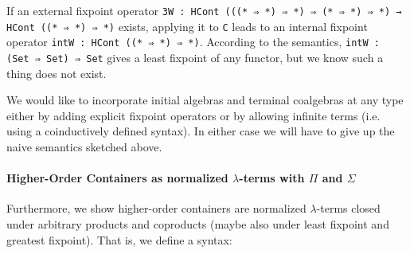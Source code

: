 \documentclass{easychair}
\begin{document}
\noindent
If an external fixpoint operator \texttt{3W : HCont (((* ⇒ *) ⇒ *) ⇒ (* ⇒ *) ⇒ *) → HCont ((* ⇒ *) ⇒ *)}
exists, applying it to \texttt{C} leads to an internal fixpoint operator \texttt{intW : HCont ((* ⇒ *) ⇒ *)}.
According to the semantics, \texttt{intW : (Set ⇒ Set) ⇒ Set} gives a least fixpoint of any functor, but we know such a thing does not
exist.

We would like to incorporate initial algebras and terminal coalgebras
at any type either by adding explicit fixpoint operators or by
allowing infinite terms (i.e. using a coinductively defined syntax).
In either case we will have to give up the naive semantics sketched
above. 

\paragraph{Higher-Order Containers as normalized $\lambda$-terms with $\Pi$ and $\Sigma$} 
Furthermore, we show higher-order containers are normalized $\lambda$-terms
closed under arbitrary products and coproducts (maybe also under least fixpoint and
greatest fixpoint). That is, we define a syntax:

\begin{code}[hide]%
\>[0]\AgdaSpace{}%
\AgdaSpace{}%
\<%
\\
\>[0]\AgdaSpace{}%
\AgdaSpace{}%
\AgdaSymbol{:}\AgdaSpace{}%
\AgdaSpace{}%
\<%
\\
\>[0][@{}l@{\AgdaIndent{0}}]%
\>[2]%
\>[6]\AgdaSymbol{:}\AgdaSpace{}%
\<%
\\
%
\>[2]\AgdaSpace{}%
\AgdaSymbol{:}\AgdaSpace{}%
\AgdaSpace{}%
\AgdaSpace{}%
\AgdaSpace{}%
\AgdaSpace{}%
\<%
\\
%
\\[\AgdaEmptyExtraSkip]%
\>[0]\AgdaSpace{}%
\AgdaSpace{}%
\AgdaSymbol{:}\AgdaSpace{}%
\AgdaSpace{}%
\AgdaSpace{}%
\AgdaSpace{}%
\AgdaSpace{}%
\AgdaSpace{}%
\<%
\\
%
\\[\AgdaEmptyExtraSkip]%
\>[0]\<%
\\
\>[0][@{}l@{\AgdaIndent{0}}]%
\>[2]\AgdaSpace{}%
\AgdaSymbol{:}\AgdaSpace{}%
\<%
\\
%
\>[2]\AgdaSpace{}%
\AgdaSpace{}%
\AgdaSymbol{:}\AgdaSpace{}%
\<%
\end{code}
\end{document}
